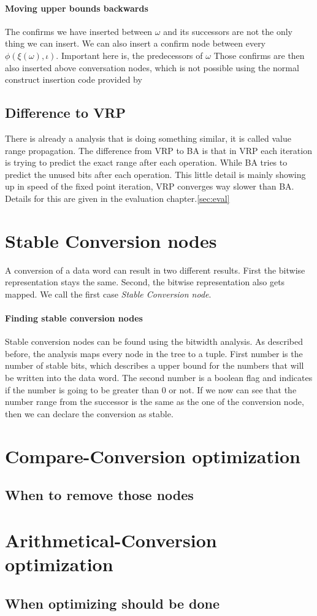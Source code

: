 \paragraph{Moving upper bounds backwards}
The confirms we have inserted between $\omega$ and its successors are not the only thing we can insert. We can also insert a confirm node between every $\phi(\xi(\omega), \iota)$. Important here is, the predecessors of $\omega$
Those confirms are then also inserted above conversation nodes, which is not possible using the normal construct insertion code provided by \libFIRM


\subsection{Difference to VRP}

There is already a analysis that is doing something similar, it is called value range propagation. The difference from VRP to BA is that in VRP each iteration is trying to predict the exact range after each operation. While BA tries to predict the unused bits after each operation. This little detail is mainly showing up in speed of the fixed point iteration, VRP converges way slower than BA. Details for this are given in the evaluation chapter.\ref{sec:eval} 

\section{Stable Conversion nodes}
A conversion of a data word can result in two different results. First the bitwise representation stays the same. Second, the bitwise representation also gets mapped.
We call the first case \textit{Stable Conversion node}.

\paragraph{Finding stable conversion nodes}
Stable conversion nodes can be found using the bitwidth analysis. As described before, the analysis maps every node in the tree to a tuple. First number is the number of stable bits, which describes a upper bound for the numbers that will be written into the data word. The second number is a boolean flag and indicates if the number is going to be greater than 0 or not. If we now can see that the number range from the successor is the same as the one of the conversion node, then we can declare the conversion as stable.



\section{Compare-Conversion optimization}
\subsection{When to remove those nodes}

\section{Arithmetical-Conversion optimization}
\subsection{When optimizing should be done}